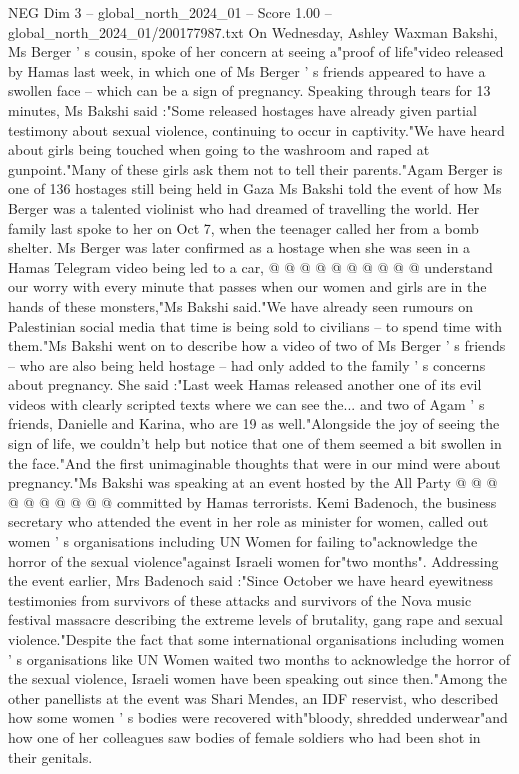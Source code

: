 \begin{textsample}{NEG Dim 3 – global\_north\_2024\_01 – Score 1.00 – global\_north\_2024\_01/200177987.txt}  \label{ex:f3_neg_235}
On Wednesday, Ashley Waxman Bakshi, Ms Berger ' s cousin, spoke of her concern at seeing a"proof of life"video released by Hamas last week, in which one of Ms Berger ' s friends appeared to have a swollen face -- which can be a sign of pregnancy.
Speaking through tears for 13 minutes, Ms Bakshi said :"Some released hostages have already given partial testimony about sexual violence, continuing to occur in captivity."We have heard about girls being touched when going to the washroom and raped at gunpoint."Many of these girls ask them not to tell their parents."Agam Berger is one of 136 hostages still being held in Gaza Ms Bakshi told the event of how Ms Berger was a talented violinist who had dreamed of travelling the world.
Her family last spoke to her on Oct 7, when the teenager called her from a bomb shelter.
Ms Berger was later confirmed as a hostage when she was seen in a Hamas Telegram video being led to a car, @ @ @ @ @ @ @ @ @ @ understand our worry with every minute that passes when our women and girls are in the hands of these monsters,"Ms Bakshi said."We have already seen rumours on Palestinian social media that time is being sold to civilians -- to spend time with them."Ms Bakshi went on to describe how a video of two of Ms Berger ' s friends -- who are also being held hostage -- had only added to the family ' s concerns about pregnancy.
She said :"Last week Hamas released another one of its evil videos with clearly scripted texts where we can see the... and two of Agam ' s friends, Danielle and Karina, who are 19 as well."Alongside the joy of seeing the sign of life, we couldn't help but notice that one of them seemed a bit swollen in the face."And the first unimaginable thoughts that were in our mind were about pregnancy."Ms Bakshi was speaking at an event hosted by the All Party @ @ @ @ @ @ @ @ @ @ committed by Hamas terrorists.
Kemi Badenoch, the business secretary who attended the event in her role as minister for women, called out women ' s organisations including UN Women for failing to"acknowledge the horror of the sexual violence"against Israeli women for"two months".
Addressing the event earlier, Mrs Badenoch said :"Since October we have heard eyewitness testimonies from survivors of these attacks and survivors of the Nova music festival massacre describing the extreme levels of brutality, gang rape and sexual violence."Despite the fact that some international organisations including women ' s organisations like UN Women waited two months to acknowledge the horror of the sexual violence, Israeli women have been speaking out since then."Among the other panellists at the event was Shari Mendes, an IDF reservist, who described how some women ' s bodies were recovered with"bloody, shredded underwear"and how one of her colleagues saw bodies of female soldiers who had been shot in their genitals.

\end{textsample}
